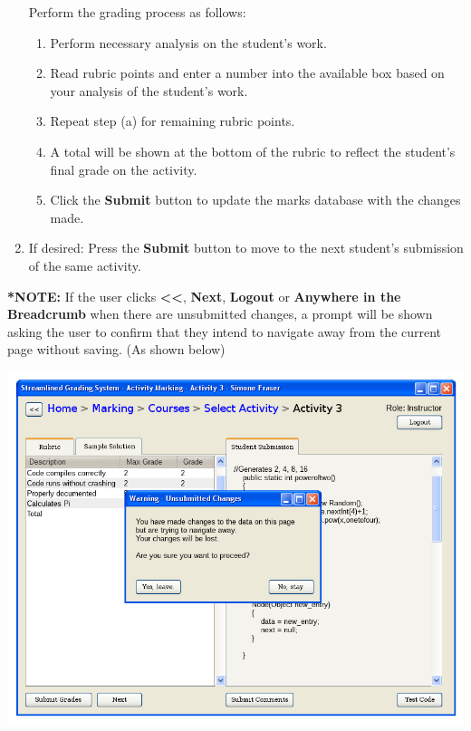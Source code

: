 \documentclass{article}
\begin{document}
\begin{enumerate}
\begin{center}
   \label{marking}
  \end{center}
    Perform the grading process as follows:
    \begin{enumerate}
      \item Perform necessary analysis on the student's work. 
      \item Read rubric points and enter a number into the available box 
        based on your analysis of the student's work.
      \item Repeat step (a) for remaining rubric points.
      \item A total will be shown at the bottom of the rubric to reflect the
        student's final grade on the activity.
       \item Click the \textbf{Submit} button to update the marks database with
         the changes made.
    \end{enumerate}

  \item If desired: Press the \textbf{Submit} button to move to the next
    student's submission of the same activity.
\end{enumerate}
\textbf{*NOTE: }If the user clicks \textbf{<<}, \textbf{Next}, \textbf{Logout}
or \textbf{Anywhere in the Breadcrumb} when there are unsubmitted changes, a
prompt will be shown asking the user to confirm that they intend to navigate away
from the current page without saving. (As shown below)

\begin{center}
  \includegraphics[scale=0.55]{../images/UIMockups/pngs/activityMarkingWarning}
\end{center}
\end{document}

